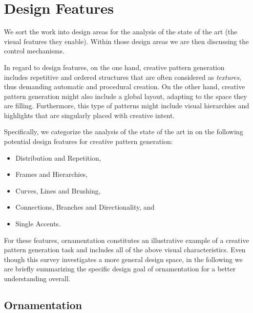 
\section{Design Features}\label{sec:design}
We sort the work into design areas for the analysis of the state of the art (the visual features they enable). Within those design areas we are then discussing the control mechanisms.

In regard to design features, on the one hand, creative pattern generation includes repetitive and ordered structures that are often considered as \textit{textures}, thus demanding automatic and procedural creation. On the other hand, creative pattern generation might also include a global layout, adapting to the space they are filling. Furthermore, this type of patterns might include visual hierarchies and highlights that are singularly placed with creative intent. 

Specifically, we categorize the analysis of the state of the art in  on the following potential design features for creative pattern generation:
\begin{itemize}
    \item Distribution and Repetition,
    \item Frames and Hierarchies,
    \item Curves, Lines and Brushing,
    \item Connections, Branches and Directionality, and
    \item Single Accents.
\end{itemize}

For these features, ornamentation constitutes an illustrative example of a creative pattern generation task and includes all of the above visual characteristics. Even though this survey investigates a more general design space, in the following we are briefly summarizing the specific design goal of ornamentation for a better understanding overall. 

\subsection{Ornamentation}
\label{subsubsec:ornamentation}

